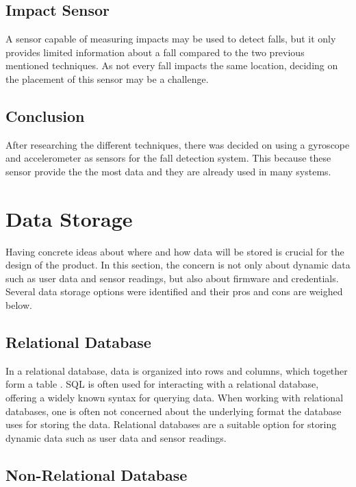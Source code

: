 \documentclass{article}
\begin{document}
\subsection{Impact Sensor}

A sensor capable of measuring impacts may be used to detect falls, but it only provides limited information about a fall compared to the two previous mentioned techniques. As not every fall impacts the same location, deciding on the placement of this sensor may be a challenge.

\subsection{Conclusion}

After researching the different techniques, there was decided on using a gyroscope and accelerometer as sensors for the fall detection system.
This because these sensor provide the the most data and they are already used in many systems.

\section{Data Storage}

Having concrete ideas about where and how data will be stored is crucial for the design of the product.
In this section, the concern is not only about dynamic data such as user data and sensor readings, but also about firmware and credentials.
Several data storage options were identified and their pros and cons are weighed below.

\subsection{Relational Database}

In a relational database, data is organized into rows and columns, which together form a table \cite{ibm-rd}.
SQL is often used for interacting with a relational database, offering a widely known syntax for querying data.
When working with relational databases, one is often not concerned about the underlying format the database uses for storing the data.
Relational databases are a suitable option for storing dynamic data such as user data and sensor readings.

\subsection{Non-Relational Database}
\end{document}
